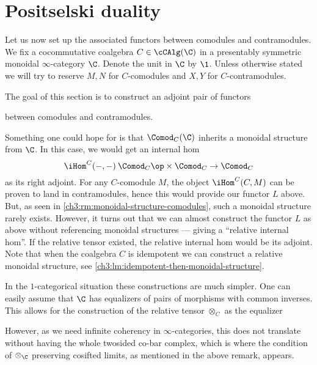 

\section{Positselski duality}

Let us now set up the associated functors between comodules and contramodules. We fix a cocommutative coalgebra $C\in \cCAlg(\C)$ in a presentably symmetric monoidal $\infty$-category $\C$. Denote the unit in $\C$ by $\1$. Unless otherwise stated we will try to reserve $M, N$ for $C$-comodules and $X, Y$ for $C$-contramodules. 

The goal of this section is to construct an adjoint pair of functors
\begin{center}
\end{center}
between comodules and contramodules. 


\begin{remark}
    Something one could hope for is that $\Comod_C(\C)$ inherits a monoidal structure from $\C$. In this case, we would get an internal hom 
    \[\iHom^C(-,-)\:\Comod_C\op\times \Comod_C\to \Comod_C \]
    as its right adjoint. For any $C$-comodule $M$, the object $\iHom^C(C,M)$ can be proven to land in contramodules, hence this would provide our functor $L$ above. But, as seen in \cref{ch3:rm:monoidal-structure-comodules}, such a monoidal structure rarely exists.   However, it turns out that we can almost construct the functor $L$ as above without referencing monoidal structures --- giving a ``relative internal hom''. If the relative tensor existed, the relative internal hom would be its adjoint. Note that when the coalgebra $C$ is idempotent we can construct a relative monoidal structure, see \cref{ch3:lm:idempotent-then-monoidal-structure}. 
\end{remark}

\begin{remark}
    In the $1$-categorical situation these constructions are much simpler. One can easily assume that $\C$ has equalizers of pairs of morphisms with common inverses. This allows for the construction of the relative tensor $\otimes_C$ as the equalizer
    \begin{center}
    \end{center}
    However, as we need infinite coherency in $\infty$-categories, this does not translate without having the whole twosided co-bar complex, which is where the condition of $\otimes_\C$ preserving cosifted limits, as mentioned in the above remark, appears.    
\end{remark}




